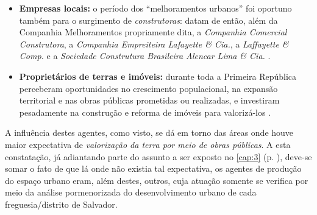 \begin{itemize}
\item \textbf{Empresas locais:} o período dos ``melhoramentos urbanos'' foi oportuno também para o surgimento de \textit{construtoras}: datam de então, além da Companhia Melhoramentos propriamente dita, a \textit{Companhia Comercial Construtora}, a \textit{Companhia Empreiteira Lafayette \& Cia.}, a \textit{Laffayette \& Comp.} e a \textit{Sociedade Construtura Brasileira Alencar Lima \& Cia.} \cite{flexor_higi_2011}.
\item \textbf{Proprietários de terras e imóveis:} durante toda a Primeira República perceberam oportunidades no crescimento populacional, na expansão territorial e nas obras públicas prometidas ou realizadas, e investiram pesadamente na construção e reforma de imóveis para valorizá-los \cite{almeida_victoria_1997,almeida_vitrinescomercio_2014}.
\end{itemize}

A influência destes agentes, como visto, se dá em torno das áreas onde houve maior expectativa de \textit{valorização da terra por meio de obras públicas}. A esta constatação, já adiantando parte do assunto a ser exposto no \autoref{cap:3} (p. \pageref{cap:3}), deve-se somar o fato de que lá onde não existia tal expectativa, os agentes de produção do espaço urbano eram, além destes, outros, cuja atuação somente se verifica por meio da análise pormenorizada do desenvolvimento urbano de cada freguesia/distrito de Salvador.
